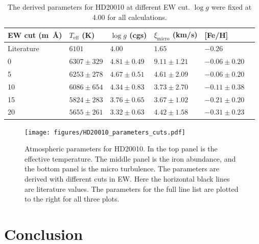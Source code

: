 \documentclass{aa}
\begin{document}
\begin{table}[htb!]
    \caption{The derived parameters for HD20010 at different EW cut. $\log g$
        were fixed at 4.00 for all calculations.}
    \label{tab:hd20010}
    \centering
    \begin{tabular}{llllll}
      \hline\hline
        EW cut (\si{m\angstrom}) & $T_\mathrm{eff}$ (K) & $\log g$ (cgs)   & $\xi_\mathrm{micro}$ (km/s)  & [Fe/H]           \\
      \hline
        Literature               & $6101        $       & $4.00         $  & $1.65         $              & $-0.26         $ \\
      \hline
        0                        & $6307 \pm 329$       & $4.81 \pm 0.49$  & $9.11 \pm 1.21$              & $-0.06 \pm 0.20$ \\
        5                        & $6253 \pm 278$       & $4.67 \pm 0.51$  & $4.61 \pm 2.09$              & $-0.06 \pm 0.20$ \\
       10                        & $6086 \pm 654$       & $4.34 \pm 0.83$  & $3.73 \pm 2.70$              & $-0.11 \pm 0.38$ \\
       15                        & $5824 \pm 283$       & $3.76 \pm 0.65$  & $3.67 \pm 1.02$              & $-0.21 \pm 0.20$ \\
       20                        & $5655 \pm 261$       & $3.32 \pm 0.63$  & $4.42 \pm 1.58$              & $-0.31 \pm 0.23$ \\
      \hline
    \end{tabular}
\end{table}



\begin{figure}[tpb!]
    \centering
    \texttt{[image: figures/HD20010\_parameters\_cuts.pdf]}
    \caption{Atmospheric parameters for HD20010. In the top panel is
    the effective temperature. The middle panel is the iron abundance,
    and the bottom panel is the micro turbulence. The parameters are
    derived with different cuts in EW. Here the horizontal black lines
    are literature values. The parameters for the full line list are
    plotted to the right for all three plots.}
    \label{fig:HD20010_parameters_cuts}
\end{figure}




\section{Conclusion}
\label{sec:conclusion}
\end{document}
